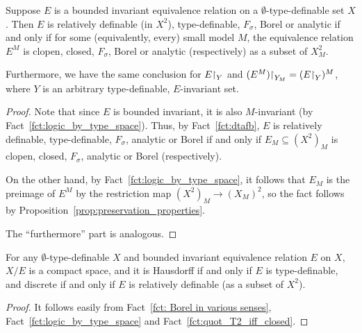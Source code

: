 	
	\begin{fct}\label{fct: Borel in various senses}
		Suppose $E$ is a bounded invariant equivalence relation on a $\emptyset$-type-definable set $X$. Then $E$ is relatively definable (in $X^2$), type-definable, $F_\sigma$, Borel or analytic if and only if for some (equivalently, every) small model $M$, the equivalence relation $E^M$ is clopen, closed, $F_\sigma$, Borel or analytic (respectively) as a subset of $X_M^2$.
		
		Furthermore, we have the same conclusion for $E\mathord{\upharpoonright}_Y$ and $(E^M)\mathord{\upharpoonright}_{Y_M}=(E\mathord{\upharpoonright}_Y)^M$, where $Y$ is an arbitrary type-definable, $E$-invariant set.
	\end{fct}
	\begin{proof}
		Note that since $E$ is bounded invariant, it is also $M$-invariant (by Fact~\ref{fct:logic_by_type_space}). Thus, by Fact~\ref{fct:dtafb}, $E$ is relatively definable, type-definable, $F_\sigma$, analytic or Borel if and only if $E_M\subseteq (X^2)_M$ is clopen, closed, $F_\sigma$, analytic or Borel (respectively).
		
		On the other hand, by Fact~\ref{fct:logic_by_type_space}, it follows that $E_M$ is the preimage of $E^M$ by the restriction map $(X^2)_M\to (X_M)^2$, so the fact follows by Proposition~\ref{prop:preservation_properties}.
		
		The ``furthermore'' part is analogous.
	\end{proof}
	
	\begin{fct}
		\label{fct:logic_top_cpct_T2}
		For any $\emptyset$-type-definable $X$ and bounded invariant equivalence relation $E$ on $X$, $X/E$ is a compact space, and it is Hausdorff if and only if $E$ is type-definable, and discrete if and only if $E$ is relatively definable (as a subset of $X^2$).
	\end{fct}
	\begin{proof}
		It follows easily from Fact~\ref{fct: Borel in various senses}, Fact~\ref{fct:logic_by_type_space} and Fact~\ref{fct:quot_T2_iff_closed}.
	\end{proof}
	
